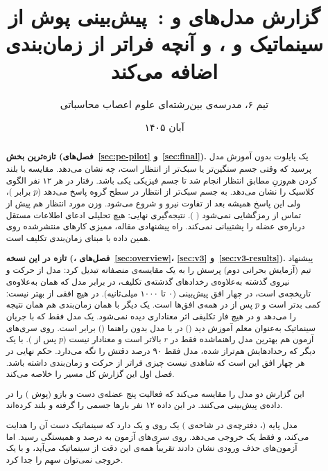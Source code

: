 \documentclass[11pt,a4paper]{article}
\title{گزارش مدل‌های \lr{KG-GT v2} و \lr{v3}:\ پیش‌بینی پوش \lr{EMG} از سینماتیک و \lr{EEG}، و آنچه \lr{EEG} فراتر از زمان‌بندی اضافه می‌کند}
\author{تیم ۶، مدرسه‌ی بین‌رشته‌ای علوم اعصاب محاسباتی}
\date{آبان ۱۴۰۵}
\begin{document}
\maketitle

\begin{abstract}
\textbf{تازه‌ترین بخش (فصل‌های~\ref{sec:pe-pilot} و~\ref{sec:final}).} یک پایلوت بدون آموزش مدل پرسید که وقتی جسم سنگین‌تر یا سبک‌تر از انتظار است،  چه نشان می‌دهد. مقایسه با بلند کردن هم‌وزنِ مطابق انتظار انجام شد تا جسم فیزیکی یکی باشد. رفتار در هر ۱۲ نفر الگوی کلاسیک را نشان می‌دهد.  به جسم سبک‌تر از انتظار در سطح گروه پاسخ می‌دهد ($p$ برابر )، ولی این پاسخ همیشه بعد از تفاوت نیرو و  شروع می‌شود. وزن مورد انتظار هم پیش از تماس از  رمزگشایی نمی‌شود ( ). نتیجه‌گیری نهایی: هیچ تحلیلی ادعای اطلاعات مستقل  درباره‌ی عضله را پشتیبانی نمی‌کند. راه پیشنهادی مقاله، ممیزی کارهای منتشرشده روی همین داده با مبنای زمان‌بندی تکلیف است.

\textbf{تازه در این نسخه (، فصل‌های~\ref{sec:overview}، \ref{sec:v3} و~\ref{sec:v3-results}).} پیشنهاد تیم (آزمایش بحرانی دوم) پرسش را به یک مقایسه‌ی منصفانه تبدیل کرد: مدل  از حرکت و نیروی گذشته به‌علاوه‌ی رخدادهای گذشته‌ی تکلیف، در برابر مدل  که همان  به‌علاوه‌ی تاریخچه‌ی  است، در چهار افق پیش‌بینی (۰ تا ۱۰۰۰ میلی‌ثانیه). در هیچ افقی  از  بهتر نیست:  کمی بدتر است و $p$ پس از  در همه‌ی افق‌ها  است.  یک  دیگر با همان زمان‌بندی هم همان نتیجه را می‌دهد و در هیچ فاز تکلیفی اثر معناداری دیده نمی‌شود. یک مدل فقط‌ که با جریان سینماتیک به‌عنوان معلم آموزش دید () در  با مدل بدون راهنما () برابر است. روی سری‌های آزمون هم بهترین مدل راهنماشده فقط  در $r$ بالاتر است و معنادار نیست ($p$ پس از  ). با  یک  دیگر که رخدادهایش هم‌تراز شده، مدل فقط‌ ۹۰ درصد دقتش را نگه می‌دارد. حکم نهایی  در هر چهار افق این است که شاهدی نیست  چیزی فراتر از حرکت و زمان‌بندی داشته باشد. فصل اول این گزارش کل مسیر را خلاصه می‌کند.

این گزارش دو مدل را مقایسه می‌کند که فعالیت پنج عضله‌ی دست و بازو (پوش ) را در داده‌ی  پیش‌بینی می‌کنند. در این داده ۱۲ نفر بارها جسمی را گرفته و بلند کرده‌اند.

مدل پایه (، دفترچه‌ی  در شاخه‌ی ) یک  روی  و یک  دارد که سینماتیک دست آن را هدایت می‌کند، و فقط یک خروجی می‌دهد. روی سری‌های آزمون به   درصد و همبستگی  رسید. اما آزمون‌های حذف ورودی نشان دادند تقریباً همه‌ی این دقت از سینماتیک می‌آید، و با یک خروجی نمی‌توان سهم  را جدا کرد.


\end{abstract}
\end{document}
